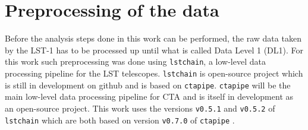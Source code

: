 \chapter{Preprocessing of the data}
\label{ch:prepro}

Before the analysis steps done in this work can be performed, the raw data taken by the LST-1 has to be processed up until what is called Data Level 1 (DL1).
For this work such preprocessing was done using \texttt{lstchain}, a low-level data processing pipeline for the LST telescopes. 
\texttt{lstchain} is open-source project which is still in development on github \cite{lstchain} and is based on \texttt{ctapipe}. 
\texttt{ctapipe} will be the main low-level data processing pipeline for CTA and is itself in development as an open-source project.
This work uses the versions \texttt{v0.5.1} and \texttt{v0.5.2} of \texttt{lstchain} which are both based on version \texttt{v0.7.0} of \texttt{ctapipe} \cite{ctapipe}. 

